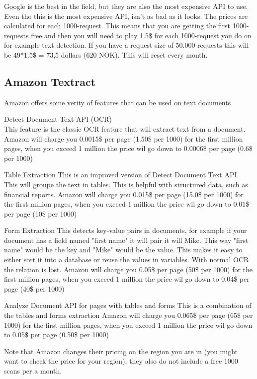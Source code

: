 Google is the best in the field, but they are also the most expensive API to use.
Even tho this is the most expensive API, isn't as bad as it looks.
The prices are calculated for each 1000-request.
This means that you are getting the first 1000-requests free and then you will need to play 1.5\$ for each 1000-request you do on for example text detection.
If you have a request size of 50.000-requests this will be 49*1.5\$ = 73,5 dollars (620 NOK).
This will reset every month.

\subsection{Amazon Textract}\label{subsec:API_Amazon}

Amazon offers some verity of features that can be used on text documents

Detect Document Text API (OCR)\\
This feature is the classic OCR feature that will extract text from a document.\\
Amazon will charge you 0.0015\$ per page (1.50\$ per 1000) for the first million pages, when you exceed 1 million the price wil go down to
0.0006\$ per page (0.6\$ per 1000)

Table Extraction
This is an improved version of Detect Document Text API. This will groupe the text in tables.
This is helpful with structured data, such as financial reports.
Amazon will charge you 0.015\$ per page (15.0\$ per 1000) for the first million pages, when you exceed 1 million the price wil go down to
0.01\$ per page (10\$ per 1000)

Form Extraction
This detects key-value pairs in documents, for example if your document has a field named "first name" it will pair it will Mike.
This way "first name" would be the key and "Mike" would be the value.
This makes it easy to either sort it into a database or reuse the values in variables.
With normal OCR the relation is lost.
Amazon will charge you 0.05\$ per page (50\$ per 1000) for the first million pages, when you exceed 1 million the price wil go down to
0.04\$ per page (40\$ per 1000)

Analyze Document API for pages with tables and forms
This is a combination of the tables and forms extraction
Amazon will charge you 0.065\$ per page (65\$ per 1000) for the first million pages, when you exceed 1 million the price wil go down to
0.05\$ per page (0.50\$ per 1000)

Note that Amazon changes their pricing on the region you are in (you might want to check the price for your region), they also do not include a free 1000 scans per a month.

